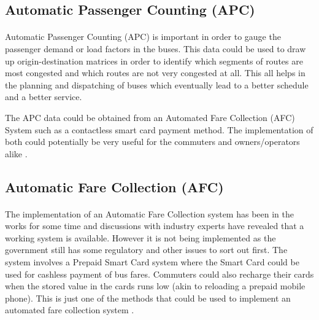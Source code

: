 \subsection{Automatic Passenger Counting (APC)}

\paragraph{ } Automatic Passenger Counting (APC) is important in order to gauge the passenger demand or load factors in the buses. This data could be used to draw up origin-destination matrices in order to identify which segments of routes are most congested and which routes are not very congested at all. This all helps in the planning and dispatching of buses which eventually lead to a better schedule and a better service.

The APC data could be obtained from an Automated Fare Collection (AFC) System such as a contactless smart card payment method. The implementation of both could potentially be very useful for the commuters and owners/operators alike \cite{Wilson2009, Silva2010}.

\subsection{Automatic Fare Collection (AFC)}

\paragraph{ } The implementation of an Automatic Fare Collection system has been in the works for some time and discussions with industry experts have revealed that a working system is available. However it is not being implemented as the government still has some regulatory and other issues to sort out first. The system involves a Prepaid Smart Card system where the Smart Card could be used for cashless payment of bus fares. Commuters could also recharge their cards when the stored value in the cards runs low (akin to reloading a prepaid mobile phone). This is just one of the methods that could be used to implement an automated fare collection system \cite{Wilson2009, Silva2010}.

